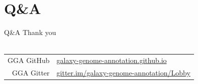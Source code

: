 \documentclass[12pt]{phage3slides} %
\begin{document}
\section{Q\&A}
\begin{frame}{Q\&A}
    Thank you \\\ \\
    \begin{center}
        \begin{tabular}{rl}
            \color{gray} GGA GitHub & \href{https://galaxy-genome-annotation.github.io/}{galaxy-genome-annotation.github.io}\\
            \color{gray} GGA Gitter & \href{https://gitter.im/galaxy-genome-annotation/Lobby}{gitter.im/galaxy-genome-annotation/Lobby}\\
            \end{tabular}\\[1cm]
            \fundingNSFABIannotation
    \end{center}
\end{frame}
\end{document}
